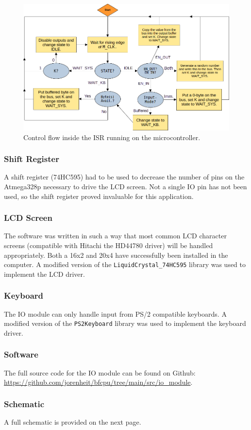 \begin{figure}[H]
  \centering
  \includegraphics[width=\textwidth]{img/iomodule_flowchart}
  \caption{Control flow inside the ISR running on the microcontroller.}
  \label{fig:isrflow}
\end{figure}

\subsubsection{Shift Register}
A shift register (74HC595) had to be used to decrease the number of pins on the Atmega328p necessary to drive the LCD screen. Not a single IO pin has not been used, so the shift register proved invaluable for this application.

\subsubsection{LCD Screen}
The software was written in such a way that most common LCD character screens (compatible with Hitachi the HD44780 driver) will be handled appropriately. Both a 16x2 and 20x4 have successfully been installed in the computer. A modified version of the \texttt{LiquidCrystal\_74HC595} library was used to implement the LCD driver.

\subsubsection{Keyboard}
The IO module can only handle input from PS/2 compatible keyboards. A modified version of the \texttt{PS2Keyboard} library was used to implement the keyboard driver.

\subsubsection{Software}
The full source code for the IO module can be found on Github: \url{https://github.com/jorenheit/bfcpu/tree/main/src/io_module}.

\subsubsection{Schematic}
A full schematic is provided on the next page.


